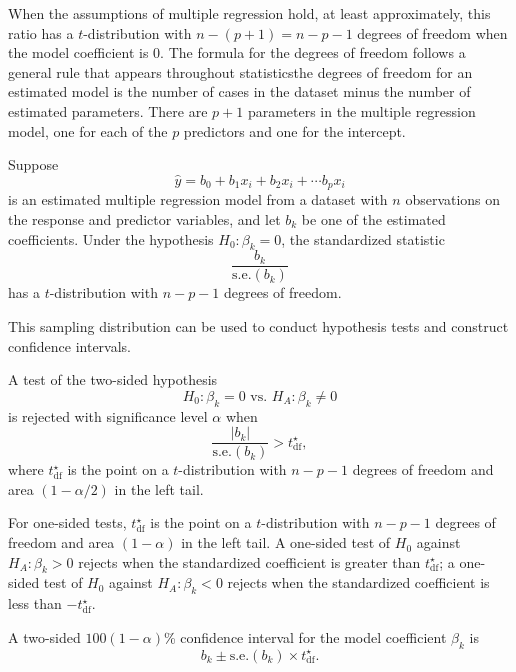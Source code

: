 When the assumptions of multiple regression hold, at least approximately, this ratio has a $t$-distribution with $n - (p + 1) =n - p - 1$ degrees of freedom when the model coefficient is 0. The formula for the degrees of freedom follows a general rule that appears throughout statistics\textemdash the degrees of freedom for an estimated model is the number of cases in the dataset minus the number of estimated parameters.  There are $p + 1$ parameters in the multiple regression model, one for each of the $p$ predictors and one for the intercept.

\begin{termBox}{
Suppose 
\[
\hat{y} = b_0 + b_1 x_{i} + b_2 x_{i} +\cdots b_p x_{i}
\]
is an estimated multiple regression model from a dataset with $n$ observations on the response and predictor variables, and let $b_k$ be one of the estimated coefficients.  Under the hypothesis $H_0: \beta_k = 0$, the standardized statistic
\[
      \frac{b_k}{\textrm{s.e.}(b_k)}
\]
has a $t$-distribution with $n - p - 1$ degrees of freedom.}
\end{termBox}

This sampling distribution can be used to conduct hypothesis tests and construct confidence intervals.

\begin{termBox}{
A test of the two-sided hypothesis
\[
  H_0: \beta_k = 0 \text{ vs. } H_A: \beta_k \ne 0
\]
is rejected with significance level $\alpha$ when 
\[
     \frac{|b_k|}{\textrm{s.e.}(b_k)} > t_{\text{df}}^\star,
\]
where $t_{\text{df}}^\star$ is the point on a $t$-distribution with $n - p - 1$ degrees of freedom and area $(1 - \alpha/2)$ in the left tail.}
\end{termBox}

For one-sided tests, $t_{\text{df}}^\star$ is the point on a $t$-distribution with $n - p - 1$ degrees of freedom and area $(1 - \alpha)$ in the left tail. A one-sided test of $H_0$ against $H_A: \beta_k > 0$ rejects when the standardized coefficient is greater than  $ t_{\text{df}}^\star$; a one-sided test of $H_0$ against $H_A: \beta_k < 0$  rejects when the standardized coefficient is less than $-t_{\text{df}}^\star$. 

\begin{termBox}{
A two-sided $100(1 - \alpha)$\% confidence interval for the model coefficient $\beta_k$ is 
\[
     b_k \pm {\textrm{s.e.}(b_k)} \times t_{\text{df}}^\star.
\]}
\end{termBox}


